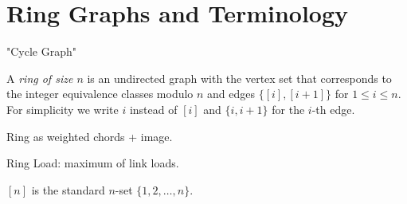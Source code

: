 \section{Ring Graphs and Terminology}

"Cycle Graph"

A \emph{ring of size $n$} is an undirected graph with the vertex set that corresponds to the integer equivalence classes modulo $n$ and edges $\{[i], [i+1]\}$ for $1 \leq i \leq n$.
For simplicity we write $i$ instead of $[i]$ and $\{i, i+1\}$ for the $i$-th edge. 

Ring as weighted chords + image.

Ring Load: maximum of link loads.

$[n]$ is the standard $n$-set $\{1, 2, \ldots, n\}$.
